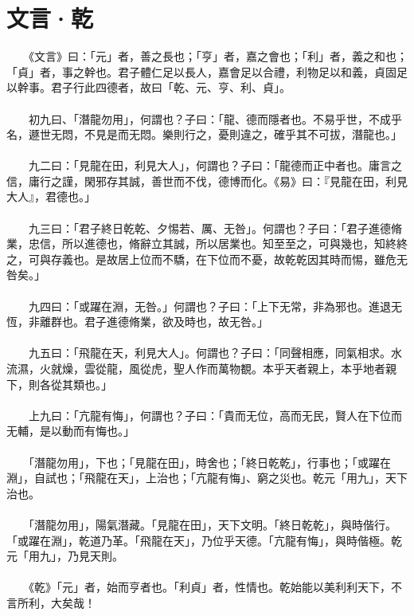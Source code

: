 \section{文言·乾}

　　《文言》曰：「元」者，善之長也；「亨」者，嘉之會也；「利」者，義之和也；「貞」者，事之幹也。君子體仁足以長人，嘉會足以合禮，利物足以和義，貞固足以幹事。君子行此四德者，故曰「乾、元、亨、利、貞」。
\\\\
　　初九曰、「潛龍勿用」，何謂也？子曰：「龍、德而隱者也。不易乎世，不成乎名，遯世无悶，不見是而无悶。樂則行之，憂則違之，確乎其不可拔，潛龍也。」
\\\\
　　九二曰：「見龍在田，利見大人」，何謂也？子曰：「龍德而正中者也。庸言之信，庸行之謹，閑邪存其誠，善世而不伐，德博而化。《易》曰：『見龍在田，利見大人』，君德也。」
\\\\
　　九三曰：「君子終日乾乾、夕惕若、厲、无咎」。何謂也？子曰：「君子進德脩業，忠信，所以進德也，脩辭立其誠，所以居業也。知至至之，可與幾也，知終終之，可與存義也。是故居上位而不驕，在下位而不憂，故乾乾因其時而惕，雖危无咎矣。」
\\\\
　　九四曰：「或躍在淵，无咎。」何謂也？子曰：「上下无常，非為邪也。進退无恆，非離群也。君子進德脩業，欲及時也，故无咎。」
\\\\
　　九五曰：「飛龍在天，利見大人」。何謂也？子曰：「同聲相應，同氣相求。水流濕，火就燥，雲從龍，風從虎，聖人作而萬物覩。本乎天者親上，本乎地者親下，則各從其類也。」
\\\\
　　上九曰：「亢龍有悔」，何謂也？子曰：「貴而无位，高而无民，賢人在下位而无輔，是以動而有悔也。」
\\\\
　　「潛龍勿用」，下也；「見龍在田」，時舍也；「終日乾乾」，行事也；「或躍在淵」，自試也；「飛龍在天」，上治也；「亢龍有悔」、窮之災也。乾元「用九」，天下治也。
\\\\
　　「潛龍勿用」，陽氣潛藏。「見龍在田」，天下文明。「終日乾乾」，與時偕行。「或躍在淵」，乾道乃革。「飛龍在天」，乃位乎天德。「亢龍有悔」，與時偕極。乾元「用九」，乃見天則。
\\\\
　　《乾》「元」者，始而亨者也。「利貞」者，性情也。乾始能以美利利天下，不言所利，大矣哉！
\\\\
